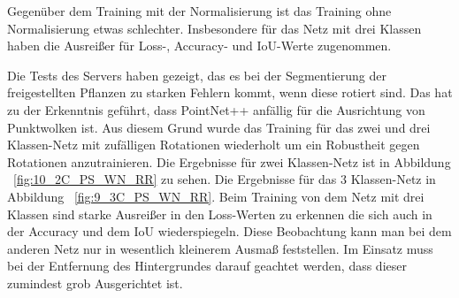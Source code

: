 \documentclass[12pt,titlepage, twoside]{article}
\begin{document}
Gegenüber dem Training mit der Normalisierung ist das Training ohne Normalisierung etwas schlechter. Insbesondere für das Netz mit drei Klassen haben die Ausreißer für Loss-, Accuracy- und IoU-Werte zugenommen.

Die Tests des Servers haben gezeigt, das es bei der Segmentierung der freigestellten Pflanzen zu starken Fehlern kommt, wenn diese rotiert sind. 
Das hat zu der Erkenntnis geführt, dass PointNet++ anfällig für die Ausrichtung von Punktwolken ist. 
Aus diesem Grund wurde das Training für das zwei und drei Klassen-Netz mit zufälligen Rotationen wiederholt um ein Robustheit gegen Rotationen anzutrainieren.
Die Ergebnisse für zwei Klassen-Netz ist in Abbildung ~\ref{fig:10_2C_PS_WN_RR} zu sehen. Die Ergebnisse für das 3 Klassen-Netz in Abbildung ~\ref{fig:9_3C_PS_WN_RR}. 
Beim Training von dem Netz mit drei Klassen sind starke Ausreißer in den Loss-Werten zu erkennen die sich auch in der Accuracy und dem IoU wiederspiegeln.
Diese Beobachtung kann man bei dem anderen Netz nur in wesentlich kleinerem Ausmaß feststellen. Im Einsatz muss bei der Entfernung des Hintergrundes darauf geachtet werden, dass dieser zumindest grob Ausgerichtet ist.
\end{document}
